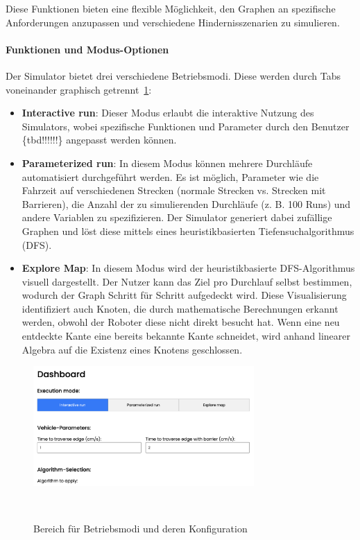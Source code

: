 \documentclass[main.tex]{subfiles} %
\begin{document}
Diese Funktionen bieten eine flexible Möglichkeit, den Graphen an spezifische Anforderungen anzupassen und verschiedene Hindernisszenarien zu simulieren.

\paragraph{Funktionen und Modus-Optionen}

Der Simulator bietet drei verschiedene Betriebsmodi. Diese werden durch Tabs voneinander graphisch getrennt~\ref{fig:DashboardConfig}:

\begin{itemize}
    \item \textbf{Interactive run}:
    Dieser Modus erlaubt die interaktive Nutzung des Simulators, wobei spezifische Funktionen und Parameter durch den Benutzer \{tbd!!!!!!\} angepasst werden können.

    \item \textbf{Parameterized run}:  
    In diesem Modus können mehrere Durchläufe automatisiert durchgeführt werden. Es ist möglich, Parameter wie die Fahrzeit auf verschiedenen Strecken (normale Strecken vs. Strecken mit Barrieren), die Anzahl der zu simulierenden Durchläufe (z. B. 100 Runs) und andere Variablen zu spezifizieren. Der Simulator generiert dabei zufällige Graphen und löst diese mittels eines heuristikbasierten Tiefensuchalgorithmus (DFS).

    \item \textbf{Explore Map}:  
    In diesem Modus wird der heuristikbasierte DFS-Algorithmus visuell dargestellt. Der Nutzer kann das Ziel pro Durchlauf selbst bestimmen, wodurch der Graph Schritt für Schritt aufgedeckt wird. Diese Visualisierung identifiziert auch Knoten, die durch mathematische Berechnungen erkannt werden, obwohl der Roboter diese nicht direkt besucht hat. Wenn eine neu entdeckte Kante eine bereits bekannte Kante schneidet, wird anhand linearer Algebra auf die Existenz eines Knotens geschlossen.
\end{itemize}

\begin{figure}[H]
    \centering
    \includegraphics[width=0.75\textwidth]{./fig_Simulation/SimulatorConfig.png}
    \caption{Bereich für Betriebsmodi und deren Konfiguration}~\label{fig:DashboardConfig}
\end{figure}
\end{document}
